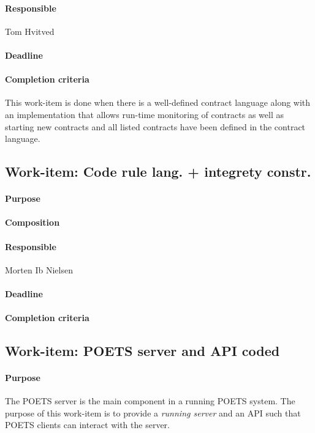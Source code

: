\documentclass[envcountsame]{llncs}
\begin{document}
\paragraph{Responsible} Tom Hvitved

\paragraph{Deadline}

\paragraph{Completion criteria} This work-item is done when there is a
well-defined contract language along with an implementation that
allows run-time monitoring of contracts as well as starting new
contracts and all listed contracts have been defined in the contract
language.

\subsection*{Work-item: Code rule lang. + integrety constr.}
\paragraph{Purpose}

\paragraph{Composition}

\paragraph{Responsible} Morten Ib Nielsen

\paragraph{Deadline}

\paragraph{Completion criteria}

\subsection*{Work-item: POETS server and API coded}
\paragraph{Purpose} The POETS server is the main component in a
running POETS system. The purpose of this work-item is to provide a
\emph{running server} and an API such that POETS clients can interact with
the server.
\end{document}
